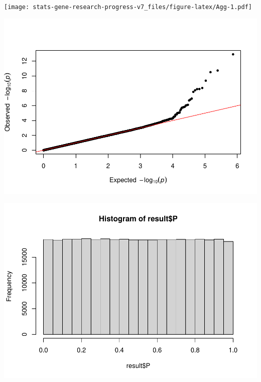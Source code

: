\documentclass[
]{article}
\newenvironment{Shaded}{\begin{snugshade}}{\end{snugshade}}
\newcommand{\DataTypeTok}[1]{\textcolor[rgb]{0.13,0.29,0.53}{#1}}
\newcommand{\DecValTok}[1]{\textcolor[rgb]{0.00,0.00,0.81}{#1}}
\newcommand{\KeywordTok}[1]{\textcolor[rgb]{0.13,0.29,0.53}{\textbf{#1}}}
\newcommand{\NormalTok}[1]{#1}
\newcommand{\OperatorTok}[1]{\textcolor[rgb]{0.81,0.36,0.00}{\textbf{#1}}}
\begin{document}
\texttt{[image: stats-gene-research-progress-v7\_files/figure-latex/Agg-1.pdf]}

\begin{Shaded}
\end{Shaded}

\includegraphics{stats-gene-research-progress-v7_files/figure-latex/Agg-2.pdf}

\begin{Shaded}
\end{Shaded}

\includegraphics{stats-gene-research-progress-v7_files/figure-latex/Agg-3.pdf}
\end{document}
